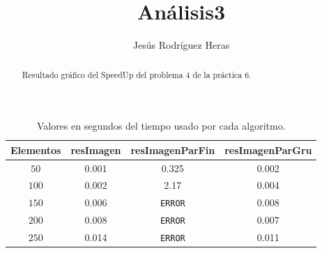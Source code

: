 \documentclass[12pt,letterpaper]{article}
\title{Análisis3}
\author{Jesús Rodríguez Heras}
\begin{document}
	
	\maketitle
	\begin{abstract} %
		\begin{center}
			Resultado gráfico del SpeedUp del problema 4 de la práctica 6.
		\end{center}
	\end{abstract}
	\thispagestyle{empty}
	\newpage
	
	
	
	
	
	\lstset{language=bash, numbers=left, numberstyle=\tiny, numbersep=10pt, firstnumber=1, stepnumber=1, basicstyle=\small\ttfamily, tabsize=1, extendedchars=true, inputencoding=latin1}


\begin{center}
	\begin{table}[htbp]
		\begin{center}
			\begin{tabular}{|c|c|c|c|}
				\hline
				\textbf{Elementos} & \textbf{resImagen} & \textbf{resImagenParFin} & \textbf{resImagenParGru}  \\
				\hline 
				$50$ & 0.001 & 0.325 & 0.002 \\ \hline
				$100$ & 0.002 & 2.17 & 0.004 \\ \hline
				$150$ & 0.006 & \texttt{ERROR} & 0.008 \\ \hline
				$200$ & 0.008 & \texttt{ERROR} & 0.007 \\ \hline
				$250$ & 0.014 & \texttt{ERROR} & 0.011 \\ \hline
			\end{tabular}
			\caption{Valores en segundos del tiempo usado por cada algoritmo.}
			\label{tabla:Valores en segundos del tiempo usado por cada algoritmo}
		\end{center}
	\end{table}
\end{center}
\end{document}
